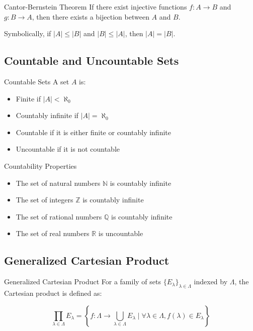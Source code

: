 \documentclass[12pt,a4paper]{article}
\begin{document}
\begin{theorembox}{Cantor-Bernstein Theorem}
If there exist injective functions $f: A \to B$ and $g: B \to A$, then there exists a bijection between $A$ and $B$. 

Symbolically, if $|A| \leq |B|$ and $|B| \leq |A|$, then $|A| = |B|$.
\end{theorembox}

\subsection{Countable and Uncountable Sets}

\begin{definitionbox}{Countable Sets}
A set $A$ is:
\begin{itemize}
    \item Finite if $|A| < \aleph_0$
    \item Countably infinite if $|A| = \aleph_0$
    \item Countable if it is either finite or countably infinite
    \item Uncountable if it is not countable
\end{itemize}
\end{definitionbox}

\begin{theorembox}{Countability Properties}
\begin{itemize}
    \item The set of natural numbers $\mathbb{N}$ is countably infinite
    \item The set of integers $\mathbb{Z}$ is countably infinite
    \item The set of rational numbers $\mathbb{Q}$ is countably infinite
    \item The set of real numbers $\mathbb{R}$ is uncountable
\end{itemize}
\end{theorembox}

\subsection{Generalized Cartesian Product}

\begin{definitionbox}{Generalized Cartesian Product}
For a family of sets $\{E_{\lambda}\}_{\lambda\in\Lambda}$ indexed by $\Lambda$, the Cartesian product is defined as:

$$\prod_{\lambda\in\Lambda} E_{\lambda} = \left\{f: \Lambda \to \bigcup_{\lambda\in\Lambda} E_{\lambda} \mid \forall \lambda \in \Lambda, f(\lambda) \in E_{\lambda}\right\}$$
\end{definitionbox}
\end{document}
